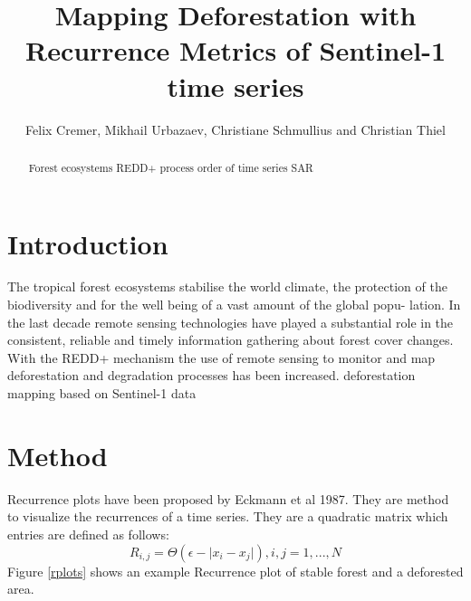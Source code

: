\documentclass{article}
\title{Mapping Deforestation with Recurrence Metrics of Sentinel-1 time series}
\author{Felix Cremer, Mikhail Urbazaev, Christiane Schmullius and Christian Thiel}
\begin{document}
\maketitle
\begin{abstract}
  Forest ecosystems
  REDD+ process
  order of time series
  SAR

%
\end{abstract}
\section{Introduction}
The tropical forest ecosystems stabilise the world climate\cite{}, the protection of the biodiversity \cite{} and
for the well being of a vast amount of the global popu-
lation\cite{}.
 In the last decade remote sensing technologies have
played a substantial role in the consistent, reliable and timely
information gathering about forest cover changes. With the
REDD+ mechanism the use of remote sensing to monitor
and map deforestation and degradation processes has been
increased.
deforestation mapping based on Sentinel-1 data



\section{Method}

Recurrence plots have been proposed by Eckmann et al 1987. They are method to visualize the recurrences of a time series. They are a quadratic matrix which entries are defined as follows:
$$R_{i,j} = \Theta(\epsilon - \lvert x_i - x_j \rvert), i,j = 1,...,N$$
Figure \ref{rplots} shows an example Recurrence plot of stable forest and a deforested area.
\end{document}
